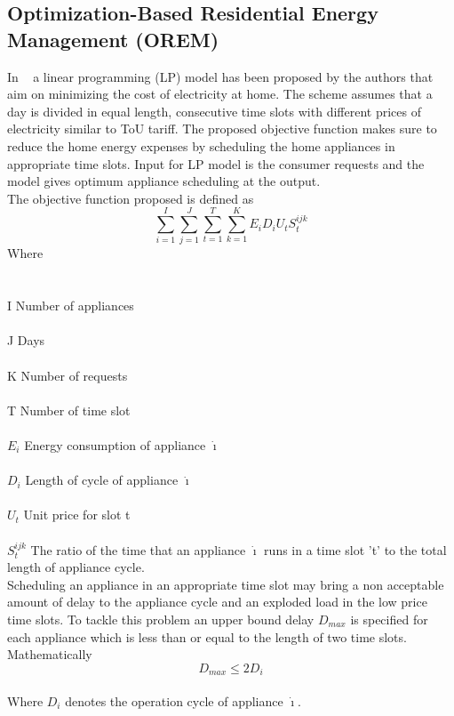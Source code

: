 \documentclass[journal]{IEEEtran}
\begin{document}
\subsection{Optimization-Based Residential Energy Management (OREM)}
In ~\cite{erol2011wireless} a linear programming (LP) model has been proposed by the authors that aim on minimizing the cost of electricity at home. The scheme assumes that a day is divided in equal length, consecutive time slots with different prices of electricity similar to ToU tariff. The proposed objective function makes sure to reduce the home energy expenses by scheduling the home appliances in appropriate time slots. Input for LP model is the consumer requests and the model gives optimum appliance scheduling at the output.\\
\indent The objective function proposed is defined as~\cite{erol2011wireless}\\
\begin{equation}
\sum_{i=1}^{I}\sum_{j=1}^{J}\sum_{t=1}^{T}\sum_{k=1}^{K}E_iD_iU_tS_{t}^{ijk}
\end{equation}
Where\\\\\\I    Number of appliances\\\\J    Days\\\\K Number of requests\\\\T    Number of time slot\\\\$E_i$    Energy consumption of appliance $\dot{\imath}$\\\\$D_i$    Length of cycle of appliance $\dot{\imath}$\\\\$U_t$    Unit price for slot t\\\\${S_t^{ijk}}$    The ratio of the time that an appliance $\dot{\imath}$ runs in a time slot 't' to the total length of appliance cycle.\\
\indent Scheduling an appliance in an appropriate time slot may bring a non acceptable amount of delay to the appliance cycle and an exploded load in the low price time slots. To tackle this problem an upper bound delay $D_{max}$ is specified for each appliance which is less than or equal to the length of two time slots. Mathematically\\
\begin{equation}
D_{max}\leq 2D_i
\end{equation}\\
Where $D_{i}$ denotes the operation cycle of appliance $\dot{\imath}$.\\
\end{document}
